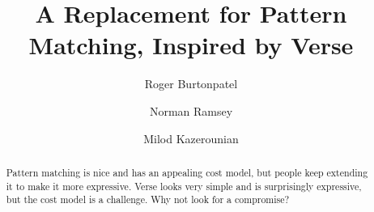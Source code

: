 \documentclass[manuscript,screen,review]{acmart}
\begin{document}
\title{A Replacement for Pattern Matching, Inspired by Verse}

\author{Roger Burtonpatel}

\author{Norman Ramsey}

\author{Milod Kazerounian}



\renewcommand{\shortauthors}{Burtonpatel et al.}

\begin{abstract}
  Pattern matching is nice and has an appealing cost model, but people keep
  extending it to make it more expressive. Verse looks very simple and is
  surprisingly expressive, but the cost model is a challenge. Why not look for a
  compromise?

\end{abstract}

\end{document}
